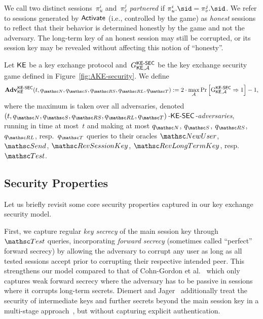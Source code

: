 We call two distinct sessions~$\pi_u^i$ and~$\pi_v^j$ \emph{partnered} if $\pi_u^i.\sid = \pi_v^j.\sid$.
We refer to sessions generated by $\mathsf{Activate}$ (i.e., controlled by the game) as \emph{honest} sessions
to reflect that their behavior is determined honestly by the game and not the adversary.
The long-term key of an honest session may still be corrupted, or its session key may be revealed without affecting this notion of ``honesty''.


\begin{definition}
	\label{def:KE-security}
	Let $\mathsf{KE}$ be a key exchange protocol and~$G^{\mathsf{KE{\text{\normalfont-}}SEC}}_{\mathsf{KE},\mathcal{A}}$ be the key exchange security game defined in Figure~\ref{fig:AKE-security}.
	We define
	\[
		\Adv^{\KESEC}_{\KE}(t, \qNewUser, \qSend, \qRevSessionKey, \qRevLongTermKey, \qTest) := 2 \cdot \max_\advA \Pr \left[ \Gm^{\KESEC}_{\KE,\advA} \Rightarrow 1 \right] - 1,
	\]
	where the maximum is taken over all adversaries, denoted \emph{$(t, \qNewUser, \qSend, \qRevSessionKey, \qRevLongTermKey, \qTest)$-$\mathsf{KE{\text{\normalfont-}}SEC}$-adversaries}, running in time at most~$t$ and making at most $\qNewUser$, $\qSend$, $\qRevSessionKey$, $\qRevLongTermKey$, resp.\ $\qTest$ queries to their oracles $\NewUser$, $\Send$, $\RevSessionKey$, $\RevLongTermKey$, resp.\ $\Test$.
\end{definition}


\subsection{Security Properties}

Let us briefly revisit some core security properties captured in our key exchange security model.

First, we capture regular \emph{key secrecy} of the main session key through $\Test$ queries, incorporating \emph{forward secrecy} (sometimes called ``perfect'' forward secrecy) by allowing the adversary to corrupt any user as long as all tested sessions accept prior to corrupting their respective intended peer.
This strengthens our model compared to that of Cohn-Gordon et al.~\cite{C:CCGJJ19} which only captures weak forward secrecy where the adversary has to be passive in sessions where it corrupts long-term secrets.
Diemert and Jager~\cite{JC:DieJag20} additionally treat the security of intermediate keys and further secrets beyond the main session key in a multi-stage approach~\cite{CCS:FisGue14}, but without capturing explicit authentication.

